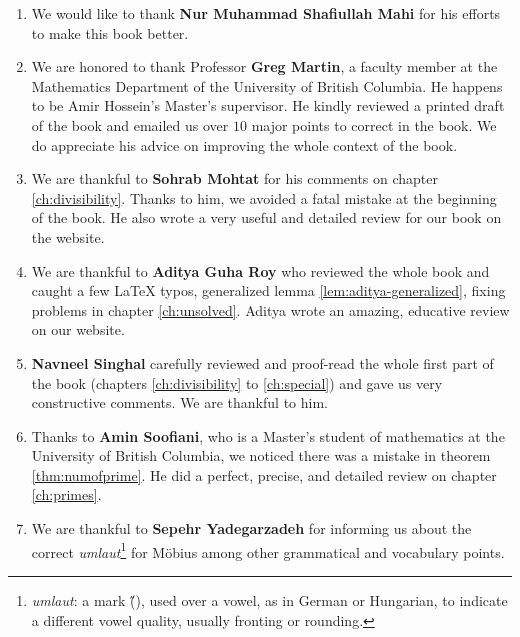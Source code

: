 \documentclass[leqno,12pt]{book}
\begin{document}
\begin{enumerate}
		\item We would like to thank \textbf{Nur Muhammad Shafiullah Mahi} for his efforts to make this book better.

		\item We are honored to thank Professor \textbf{Greg Martin}, a faculty member at the Mathematics Department of the University of British Columbia. He happens to be Amir Hossein's Master's supervisor. He kindly reviewed a printed draft of the book and emailed us over $10$ major points to correct in the book. We do appreciate his advice on improving the whole context of the book.

		\item We are thankful to \textbf{Sohrab Mohtat} for his comments on chapter \ref{ch:divisibility}. Thanks to him, we avoided a fatal mistake at the beginning of the book. He also wrote a very useful and detailed review for our book on the website.

		\item We are thankful to \textbf{Aditya Guha Roy} who reviewed the whole book and caught a few LaTeX typos, generalized lemma \eqref{lem:aditya-generalized}, fixing problems in chapter \ref{ch:unsolved}. Aditya wrote an amazing, educative review on our website.
		\item \textbf{Navneel Singhal} carefully reviewed and proof-read the whole first part of the book (chapters \ref{ch:divisibility} to \ref{ch:special}) and gave us very constructive comments. We are thankful to him.

		\item Thanks to \textbf{Amin Soofiani}, who is a Master's student of mathematics at the University of British Columbia, we noticed there was a mistake in theorem \eqref{thm:numofprime}. He did a perfect, precise, and detailed review on chapter \ref{ch:primes}.

		\item We are thankful to \textbf{Sepehr Yadegarzadeh} for informing us about the correct \textit{umlaut}\footnote{\textit{umlaut}: a mark (\H{}), used over a vowel, as in German or Hungarian, to indicate a different vowel quality, usually fronting or rounding.} for M\"{o}bius among other grammatical and vocabulary points.
	\end{enumerate}
\clearpage
\tableofcontents
\end{document}
